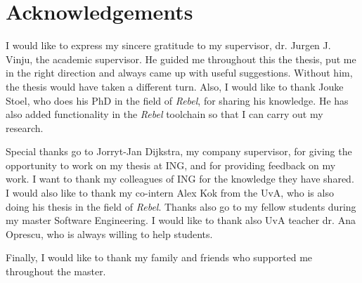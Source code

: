 \chapter*{Acknowledgements}

I would like to express my sincere gratitude to my supervisor,
dr. Jurgen J. Vinju, the academic supervisor. He guided me throughout this the
thesis, put me in the right direction and always came up with useful
suggestions. Without him, the thesis would have taken a different turn.
Also, I would like to thank Jouke Stoel, who does his PhD in the field of
\textit{Rebel}, for sharing his knowledge. He has also added functionality in
the \textit{Rebel} toolchain so that I can carry out my research.

Special thanks go to Jorryt-Jan Dijkstra, my company supervisor, for giving
the opportunity to work on my thesis at ING, and for providing feedback on
my work. I want to thank my colleagues of ING for the knowledge they have
shared. I would also like to thank my co-intern Alex Kok from the UvA, who is
also doing his thesis in the field of \textit{Rebel}. Thanks also go to my
fellow students during my master Software Engineering. I would like to thank
also UvA teacher dr. Ana Oprescu, who is always willing to help students.

Finally, I would like to thank my family and friends who supported me throughout
the master.
